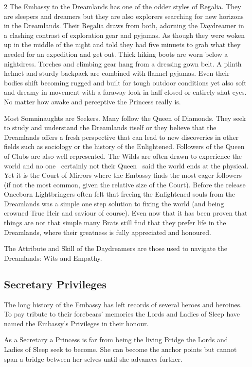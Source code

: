 \begin{multicols}{2}
The Embassy to the Dreamlands has one of the odder styles of Regalia. They are sleepers and dreamers but they are also explorers searching for new horizons in the Dreamlands. Their Regalia draws from both, adorning the Daydreamer in a clashing contrast of exploration gear and pyjamas. As though they were woken up in the middle of the night and told they had five minuets to grab what they needed for an expedition and get out. Thick hiking boots are worn below a nightdress. Torches and climbing gear hang from a dressing gown belt. A plinth helmet and sturdy backpack are combined with flannel pyjamas. Even their bodies shift becoming rugged and built for tough outdoor conditions yet also soft and dreamy in movement with a faraway look in half closed or entirely shut eyes. No matter how awake and perceptive the Princess really is.

Most Somninaughts are Seekers. Many follow the Queen of Diamonds. They seek to study and understand the Dreamlands itself or they believe that the Dreamlands offers a fresh perspective that can lead to new discoveries in other fields such as sociology or the history of the Enlightened. Followers of the Queen of Clubs are also well represented. The Wilds are often drawn to experience the world and no one \textendash\, certainly not their Queen \textendash\, said the world ends at the physical. Yet it is the Court of Mirrors where the Embassy finds the most eager followers (if not the most common, given the relative size of the Court). Before the release Onceborn Lightbringers often felt that freeing the Enlightened souls from the Dreamlands was a simple one step solution to fixing the world (and being crowned True Heir and saviour of course). Even now that it has been proven that things are not that simple many Brats still find that they prefer life in the Dreamlands, where their greatness is fully appreciated and honoured.

The Attribute and Skill of the Daydreamers are those used to navigate the Dreamlands: Wits and Empathy.

\subsection*{Secretary Privileges}

The long history of the Embassy has left records of several heroes and heroines. To pay tribute to their forebears' memories the Lords and Ladies of Sleep have named the Embassy's Privileges in their honour.

As a Secretary a Princess is far from being the living Bridge the Lords and Ladies of Sleep seek to become. She can become the anchor points but cannot span a bridge between her-selves until she advances further. 


\end{multicols}
